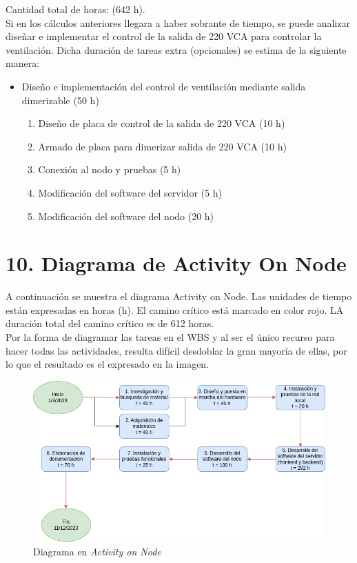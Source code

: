 \documentclass[
11pt, %
]{charter}
\begin{document}
Cantidad total de horas: (642 h). \\
Si en los cálculos anteriores llegara a haber sobrante de tiempo, se puede analizar diseñar e implementar el control de la salida de 220 VCA para controlar la ventilación. Dicha duración de tareas extra (opcionales) se estima de la siguiente manera:
\begin{itemize}

\item Diseño e implementación del control de ventilación mediante salida dimerizable (50 h)
	\begin{enumerate}
		\item Diseño de placa de control de la salida de 220 VCA (10 h)
		\item Armado de placa para dimerizar salida de 220 VCA (10 h)
		\item Conexión al nodo y pruebas (5 h)
		\item Modificación del software del servidor (5 h)
		\item Modificación del software del nodo (20 h)
	\end{enumerate}
\end{itemize}

\section{10. Diagrama de Activity On Node}
\label{sec:AoN}

A continuación se muestra el diagrama Activity on Node. Las unidades de tiempo están expresadas en horas (h). El camino crítico está marcado en color rojo. LA duración total del camino crítico es de 612 horas.\\
Por la forma de diagramar las tareas en el WBS y al ser el único recurso para hacer todas las actividades, resulta difícil desdoblar la gran mayoría de ellas, por lo que el resultado es el expresado en la imagen.

\begin{figure}[htpb]
\centering 
\includegraphics[width=.8\textwidth]{./Figuras/AoN.png}
\caption{Diagrama en \textit{Activity on Node}}
\label{fig:AoN}
\end{figure}
\end{document}
